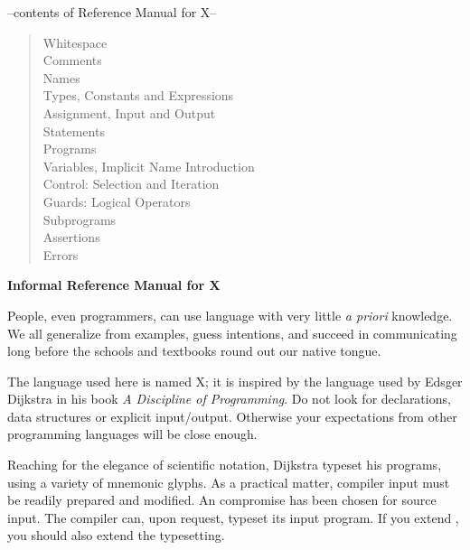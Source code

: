 




\begin{center}
  \begin{small}
    \noindent --contents of Reference Manual for X--
    \begin{quote} \raggedright
      Whitespace\\
      Comments\\
      Names\\
      Types, Constants and Expressions\\
      Assignment, Input and Output\\
      Statements\\
      Programs\\
      Variables, Implicit Name Introduction\\
      Control: Selection and Iteration\\
      Guards: Logical Operators\\
      Subprograms\\
      Assertions\\
      Errors\\
    \end{quote}
  \end{small}
\end{center}

\vspace{1em}

\begin{center}
 {\large \bf Informal Reference Manual for X} 
\end{center}
\vspace{1em}

People, even programmers, can use language with very little 
{\em a priori\/} knowledge.  We all generalize from examples, 
guess intentions, and succeed in communicating long before the 
schools and textbooks round out our native tongue.  

The language used here is named X;  
it is inspired by the language used by Edsger Dijkstra in his book
{\em A Discipline of Programming}.
Do not look for declarations, data structures or explicit input/output.
Otherwise your expectations from other programming languages will be close 
enough.  

Reaching for the elegance of scientific notation, 
Dijkstra typeset his programs, using a variety of mnemonic glyphs.
As a practical matter, compiler input must be readily prepared and modified.  
An  compromise has been chosen for  source input.  
The compiler  can, upon request, typeset its input program.  
If you extend , you should also extend the typesetting.

